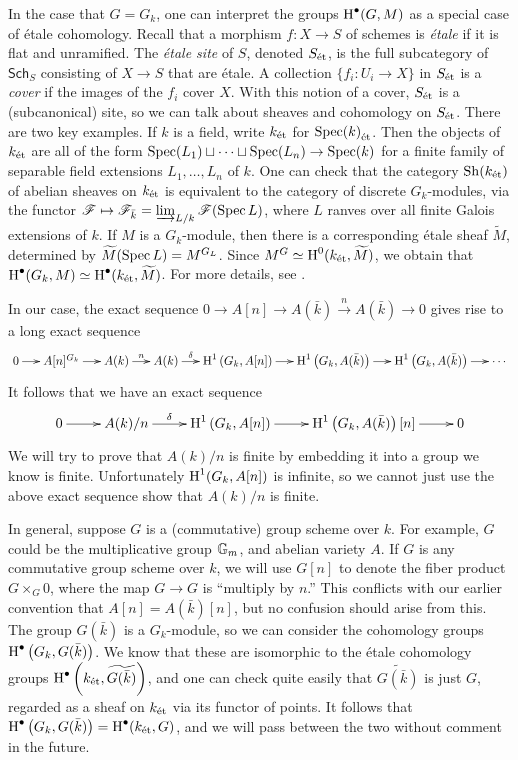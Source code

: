 \documentclass{article}
\begin{document}
In the case that $G=G_k$, one can interpret the groups $\operatorname{H}^\bullet(G,M)$ as a 
special case of \'etale cohomology. Recall that a morphism $f:X\to S$ of 
schemes is \emph{\'etale} if it is flat and unramified. The \emph{\'etale 
site} of $S$, denoted ${S}_\textnormal{\'et}$, is the full subcategory of $\mathsf{Sch}_S$ 
consisting of $X\to S$ that are \'etale. A collection $\{f_i:U_i\to X\}$ in 
${S}_\textnormal{\'et}$ is a \emph{cover} if the images of the $f_i$ cover $X$. With this 
notion of a cover, ${S}_\textnormal{\'et}$ is a (subcanonical) site, so we can talk about 
sheaves and cohomology on ${S}_\textnormal{\'et}$. There are two key examples. If $k$ is a 
field, write ${k}_\textnormal{\'et}$ for ${\operatorname{Spec}(k)}_\textnormal{\'et}$. Then the objects of ${k}_\textnormal{\'et}$ are all 
of the form $\operatorname{Spec}(L_1)\sqcup \cdots \sqcup \operatorname{Spec}(L_n)\to \operatorname{Spec}(k)$ for a 
finite family of separable field extensions $L_1,\dots,L_n$ of $k$. One can 
check that the category $\operatorname{Sh}({k}_\textnormal{\'et})$ of abelian sheaves on ${k}_\textnormal{\'et}$ is 
equivalent to the category of discrete $G_k$-modules, via the functor 
$\mathscr{F}\mapsto \mathscr{F}_{\bar k} = \varinjlim_{L/k} \mathscr{F}(\operatorname{Spec} L)$, where $L$ ranves 
over all finite Galois extensions of $k$. If $M$ is a $G_k$-module, then there 
is a corresponding \'etale sheaf $\widetilde M$, determined by 
$\widetilde M(\operatorname{Spec} L) = M^{G_L}$. Since 
$M^G\simeq \operatorname{H}^0({k}_\textnormal{\'et},\widetilde M)$, we obtain that 
$\operatorname{H}^\bullet(G_k,M) \simeq \operatorname{H}^\bullet({k}_\textnormal{\'et}, \widetilde M)$. For more details, 
see \cite[I 2.4]{de77}. 

In our case, the exact sequence 
$0\to A[n]\to A(\bar k) \xrightarrow n A(\bar k) \to 0$ gives rise to a long 
exact sequence 
\[\xymatrix@=0.5cm{
  0 \ar[r] 
    & A[n]^{G_k} \ar[r] 
    & A(k) \ar[r]^-n 
    & A(k) \ar[r]^-\delta 
    & \h^1\left(G_k,A[n]\right) \ar[r] 
    & \h^1\left(G_k,A(\bar k)\right) \ar[r] 
    & \h^1\left(G_k, A(\bar k)\right) \ar[r] 
    & \cdots
}\]
It follows that we have an exact sequence 
\[\xymatrix{
  0 \ar[r] 
    & A(k) / n \ar[r]^-\delta
    & \h^1\left(G_k,A[n]\right) \ar[r] 
    & \h^1\left(G_k,A(\bar k)\right)[n] \ar[r]
    & 0
}\]
We will try to prove that $A(k)/ n$ is finite by embedding it into a group 
we know is finite. Unfortunately $\operatorname{H}^1(G_k, A[n])$ is infinite, so we cannot 
just use the above exact sequence show that $A(k)/n$ is finite. 

In general, suppose $G$ is a (commutative) group scheme over $k$. For example, 
$G$ could be the multiplicative group $\mathbb{G}_m$, and abelian variety $A$. If 
$G$ is any commutative group scheme over $k$, we will use $G[n]$ to denote the 
fiber product $G\times_G 0$, where the map $G\to G$ is ``multiply by $n$.'' 
This conflicts with our earlier convention that $A[n]=A(\bar k)[n]$, but 
no confusion should arise from this. The group $G(\bar k)$ is 
a $G_k$-module, so we can consider the cohomology groups 
$\operatorname{H}^\bullet\left(G_k, G(\bar k)\right)$. We know that these are isomorphic to 
the \'etale cohomology groups 
$\operatorname{H}^\bullet\left({k}_\textnormal{\'et}, \widetilde{G(\bar k)}\right)$, and one can check quite 
easily that $\widetilde{G(\bar k)}$ is just $G$, regarded as a sheaf on ${k}_\textnormal{\'et}$ 
via its functor of points. It follows that 
$\operatorname{H}^\bullet\left(G_k, G(\bar k)\right) = \operatorname{H}^\bullet({k}_\textnormal{\'et}, G)$, and we will 
pass between the two without comment in the future. 
\end{document}
